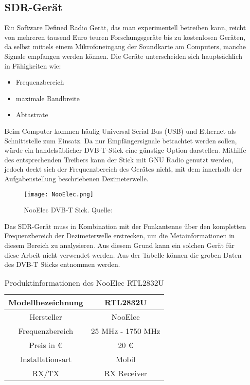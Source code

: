 \subsection{SDR-Gerät} 
Ein Software Defined Radio Gerät, das man experimentell betreiben kann, reicht von mehreren tausend Euro teuren Forschungsgeräte bis zu kostenlosen Geräten, da selbst mittels einem Mikrofoneingang der Soundkarte am Computers, manche Signale empfangen werden können. Die Geräte unterscheiden sich hauptsächlich in Fähigkeiten wie:

\begin{itemize}
	\item Frequenzbereich
	\item maximale Bandbreite
	\item Abtastrate
\end{itemize}

Beim Computer kommen häufig Universal Serial Bus (USB) und Ethernet als Schnittstelle zum  Einsatz.
Da nur Empfängersignale betrachtet werden sollen, würde ein handelsüblicher DVB-T-Stick eine günstige Option darstellen. Mithilfe des entsprechenden Treibers kann der Stick mit GNU Radio genutzt werden, jedoch deckt sich der Frequenzbereich des Gerätes nicht, mit dem innerhalb der Aufgabenstellung beschriebenen Dezimeterwelle.\\

\begin{figure}[H]
	\centering
	\texttt{[image: NooElec.png]}
	\caption[NooElec DVB-T Stick]{NooElec DVB-T Sick. Quelle: \cite{NooElec:2018}} 
	\label{NooElec}
\end{figure}

Das SDR-Gerät muss in Kombination mit der Funkantenne über den kompletten Frequenzbereich der Dezimeterwelle erstrecken, um die Metainformationen in diesem Bereich zu analysieren. Aus diesem Grund kann ein solchen Gerät für diese Arbeit nicht verwendet werden. Aus der Tabelle können die groben Daten des DVB-T Sticks entnommen werden.\\

\begin{table}[h]
	\centering
	\begin{tabular}{c|c}
		Modellbezeichnung & RTL2832U\\
		\hline
		Hersteller & NooElec\\ 
		\hline 
		Frequenzbereich & 25 MHz - 1750 MHz \\ 
		\hline 
		Preis in \euro & 20 \euro \\ 
		\hline 
		Installationsart & Mobil \\ 
		\hline 
		RX/TX & RX Receiver \\ 
	\end{tabular} 
	\caption{Produktinformationen des NooElec RTL2832U}
\end{table}

